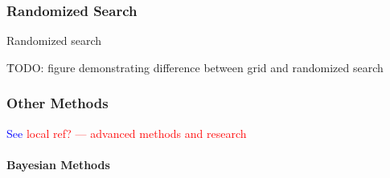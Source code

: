 \subsubsection{Randomized Search}

\r{{Randomized search} }

\r{TODO: figure demonstrating difference between grid and randomized search}

\subsubsection{Other Methods}

\textcolor{blue}{See \textcolor{red}{local ref? --- advanced methods and research}}

\paragraph{Bayesian Methods}

